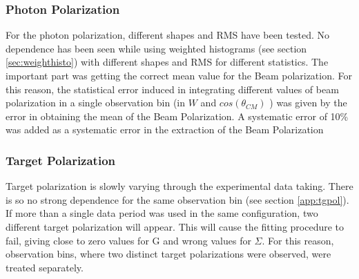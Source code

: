 \subsubsection{Photon Polarization}
For the photon polarization, different shapes and RMS have been tested. No dependence has been seen while using weighted histograms (see section \ref{sec:weighthisto}) with different shapes and RMS for different statistics. The important part was getting the correct mean value for the Beam polarization. For this reason, the statistical error induced in integrating different values of beam polarization in a single observation bin (in $W$ and $cos(\theta_{CM})$ ) was given by the error in obtaining the mean of the Beam Polarization. A systematic error of 10\% was added as a systematic error in the extraction of the Beam Polarization
\subsubsection{Target Polarization}
Target polarization is slowly varying through the experimental data taking. There is so no strong dependence for the same observation bin (see section \ref{app:tgpol}). If more than a single data period was used in the same configuration, two different target polarization will appear. This will cause the fitting procedure to fail, giving close to zero values for G and wrong values for $\Sigma$. For this reason, observation bins, where two distinct target polarizations were observed, were treated separately.   

